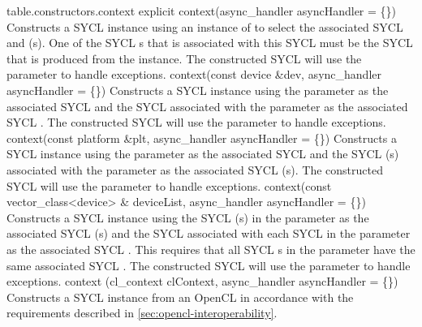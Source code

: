
 {table.constructors.context}
  \addRow
  {explicit context(async_handler asyncHandler = \{\})}
  {
    Constructs a SYCL  instance using an instance of  to select the associated SYCL  and (s). One of the SYCL s that is associated with this SYCL  must be the SYCL  that is produced from the  instance. The constructed SYCL  will use the  parameter to handle exceptions.
  }
  \addRowTwoL
  {context(const device \&dev,}
  {async_handler asyncHandler = \{\})}
  {
     Constructs a SYCL  instance using the  parameter as the associated SYCL  and the SYCL  associated with the  parameter as the associated SYCL . The constructed SYCL  will use the  parameter to handle exceptions.
  }
  \addRowTwoL
  {context(const platform \&plt,}
  {async_handler asyncHandler = \{\})}
  {
     Constructs a SYCL  instance using the  parameter as the associated SYCL  and the SYCL (s) associated with the  parameter as the associated SYCL (s). The constructed SYCL  will use the  parameter to handle exceptions.
  }   
  \addRowTwoL
  {context(const vector_class<device> \& deviceList,}
  {async_handler asyncHandler = \{\})}
  {
     Constructs a SYCL  instance using the SYCL (s) in the  parameter as the associated SYCL (s) and the SYCL  associated with each SYCL  in the  parameter as the associated SYCL . This requires that all SYCL s in the  parameter have the same associated SYCL . The constructed SYCL  will use the  parameter to handle exceptions.
  } 
  \addRowTwoL
    {context (cl_context clContext,}
    {async_handler asyncHandler = \{\})}
    {    
      Constructs a SYCL  instance from an OpenCL  in accordance with the requirements described in \ref{sec:opencl-interoperability}.
    }
\completeTable

